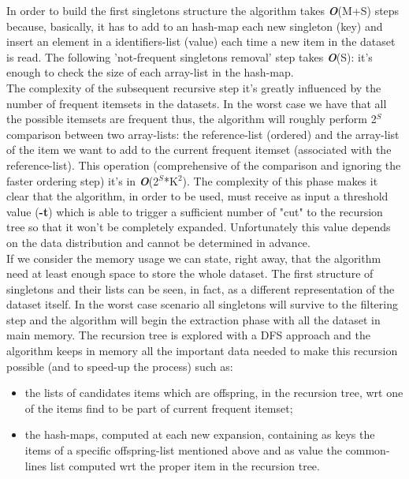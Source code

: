\documentclass[]{report}
\begin{document}
	In order to build the first singletons structure the algorithm takes \textit{\textbf{O}}(M+S) steps because, basically, it has to add to an hash-map each new singleton (key) and insert an element in a identifiers-list (value) each time a new item in the dataset is read. The following 'not-frequent singletons removal' step takes \textit{\textbf{O}}(S): it's enough to check the size of each array-list in the hash-map.  \\
	The complexity of the subsequent recursive step it's greatly influenced by the number of frequent itemsets in the datasets. In the worst case we have that all the possible itemsets are frequent thus, the algorithm will roughly perform 2$^S$  comparison between two array-lists: the reference-list (ordered) and the array-list of the item we want to add to the current frequent itemset (associated with the reference-list). This operation (comprehensive of the comparison and ignoring the faster ordering step) it's in \textit{\textbf{O}}(2$^S$*K$^2$). The complexity of this phase makes it clear that the algorithm, in order to be used, must receive as input a threshold value (\textbf{-t}) which is able to trigger a sufficient number of "cut" to the recursion tree so that it won't be completely expanded. Unfortunately this value depends on the data distribution and cannot be determined in advance.\\
	If we consider the memory usage we can state, right away, that the algorithm need at least enough space to store the whole dataset. The first structure of singletons and their lists can be seen, in fact, as a different representation of the dataset itself. In the worst case scenario all singletons will survive to the filtering step and the algorithm will begin the extraction phase with all the dataset in main memory. The recursion tree is explored with a DFS approach and the algorithm keeps in memory all the important data needed to make this recursion possible (and to speed-up the process) such as: 
	\begin{itemize}
		\item the lists of candidates items which are offspring, in the recursion tree, wrt one of the items find to be part of current frequent itemset;
		\item the hash-maps, computed at each new expansion, containing as keys the items of a specific offspring-list mentioned above and as value the common-lines list computed wrt the proper item in the recursion tree.
	\end{itemize}
\end{document}
